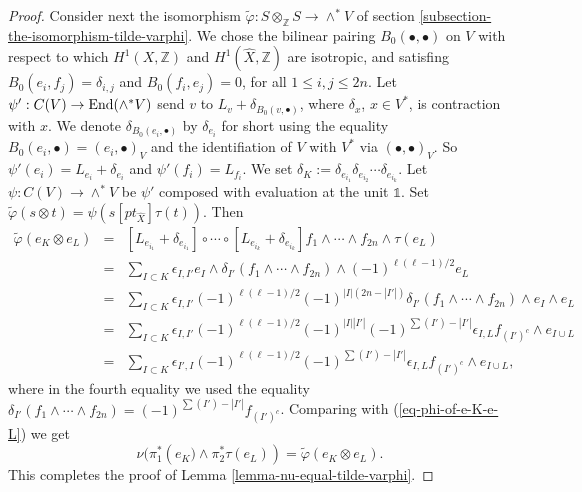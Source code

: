 \documentclass[12pt]{amsart}
\numberwithin{equation}{subsection}
\theoremstyle{plain}
\theoremstyle{definition}
\newcommand{\ZZ}{{\mathbb Z}}
\newcommand{\End}{{\rm End}}
\newcommand{\one}{{\mathbb 1}}
\begin{document}
\begin{proof}
Consider next the isomorphism $\tilde{\varphi}:S\otimes_\ZZ S\rightarrow \wedge^*V$ of section 
\ref{subsection-the-isomorphism-tilde-varphi}. We chose 
 the bilinear pairing $B_0(\bullet,\bullet)$ on $V$ with respect to which $H^1(X,\ZZ)$ and $H^1(\hat{X},\ZZ)$ are isotropic, and satisfing $B_0(e_i,f_j)=\delta_{i,j}$ and $B_0(f_i,e_j)=0$, for all $1\leq i,j\leq 2n$.
Let $\psi':C(V)\rightarrow \End(\wedge^*V)$ send $v$ to $L_v+\delta_{B_0(v,\bullet)}$, where $\delta_x$, $x\in V^*$, is contraction with $x$. 
We denote $\delta_{B_0(e_i,\bullet)}$ by $\delta_{e_i}$ for short using the equality $B_0(e_i,\bullet)=(e_i,\bullet)_V$ and the identifiation of $V$ with $V^*$ via $(\bullet,\bullet)_V$. 
So $\psi'(e_i)=
L_{e_i}+\delta_{e_i}$ and $\psi'(f_i)=L_{f_i}$. We set $\delta_K:=\delta_{e_{i_1}}\delta_{e_{i_2}}\cdots\delta_{e_{i_k}}$.
Let $\psi:C(V)\rightarrow \wedge^*V$ be $\psi'$ composed with evaluation at the unit $\one$.
Set $\tilde{\varphi}(s\otimes t)=\psi(s[pt_{\hat{X}}]\tau(t))$. Then
\begin{eqnarray*}
\tilde{\varphi}(e_K\otimes e_L)&=&
[L_{e_{i_1}}+\delta_{e_{i_1}}] \circ \cdots \circ [L_{e_{i_k}}+\delta_{e_{i_k}}] f_1\wedge \cdots \wedge f_{2n}\wedge \tau(e_L)
\\
&=& \sum_{I\subset K} \epsilon_{I,I'}e_I\wedge\delta_{I'}( f_1\wedge \cdots \wedge f_{2n})\wedge (-1)^{\ell(\ell-1)/2}e_L
\\
&=&
\sum_{I\subset K} \epsilon_{I,I'}(-1)^{\ell(\ell-1)/2} (-1)^{|I|(2n-|I'|)}\delta_{I'}(f_1\wedge\cdots\wedge f_{2n})\wedge e_I\wedge e_L
\\
&=&
\sum_{I\subset K} \epsilon_{I,I'}(-1)^{\ell(\ell-1)/2} (-1)^{|I||I'|}(-1)^{\sum(I')-|I'|}\epsilon_{I,L}f_{(I')^c}\wedge e_{I\cup L}
\\
&=&
\sum_{I\subset K} \epsilon_{I',I}(-1)^{\ell(\ell-1)/2} (-1)^{\sum(I')-|I'|}\epsilon_{I,L}f_{(I')^c}\wedge e_{I\cup L},
\end{eqnarray*}
where in the fourth equality we used the equality $\delta_{I'}(f_1\wedge\cdots\wedge f_{2n})=(-1)^{\sum(I')-|I'|}f_{(I')^c}$.
Comparing with  (\ref{eq-phi-of-e-K-e-L}) we get
\begin{equation}
\label{eq-orlov-isomorphism-categorifies-chevalley}
\nu(\pi_1^*\left(e_K)\wedge\pi_2^*\tau(e_L)\right)=\tilde{\varphi}(e_K\otimes e_L).
\end{equation}
This completes the proof of Lemma \ref{lemma-nu-equal-tilde-varphi}.
\end{proof}
\end{document}
